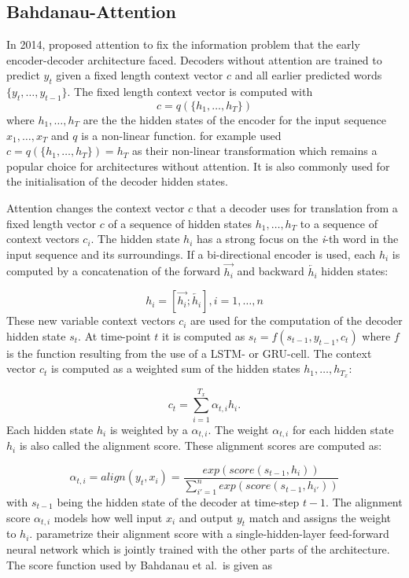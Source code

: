\documentclass[]{krantz}
\begin{document}
\hypertarget{bahdanau-attention}{%
\subsection{Bahdanau-Attention}\label{bahdanau-attention}}

In 2014, \citet{bahdanau2014neural} proposed attention to fix the information problem that
the early encoder-decoder architecture faced. Decoders without attention are trained to predict \(y_{t}\)
given a fixed length context vector \(c\) and all earlier predicted words \(\{y_t, \dots, y_{t-1}\}\).
The fixed length context vector is computed with
\[c=q(\{h_1,\dots,h_T\})\] where \(h_1,\dots,h_T\) are the the hidden states of the encoder for the input sequence
\(x_1,\dots, x_T\) and \(q\) is a non-linear function. \citet{sutskever2014sequence} for example used
\(c = q(\{h_1,\dots,h_T\}) = h_T\) as their non-linear transformation which remains a popular
choice for architectures without attention. It is also commonly used for the initialisation of the decoder hidden states.

Attention changes the context vector \(c\) that a decoder uses for translation from a fixed
length vector \(c\) of a sequence of hidden states \(h_1, \dots, h_T\) to a sequence
of context vectors \(c_i\). The hidden state \(h_i\) has a strong focus on the \emph{i}-th
word in the input sequence and its surroundings.
If a bi-directional encoder is used, each \(h_i\) is computed by a concatenation of the forward
\(\overrightarrow{h_i}\) and backward \(\overleftarrow{h_i}\) hidden states:

\[
h_i = [\overrightarrow{h_i}; \overleftarrow{h_i}], i = 1,\dots,n
\]
These new variable context vectors \(c_i\) are used for the computation of the decoder hidden state \(s_t\).
At time-point \(t\) it is computed as \(s_t = f(s_{t-1},y_{t-1},c_t)\) where \(f\) is the function resulting from
the use of a LSTM- or GRU-cell.
The context vector \(c_t\) is computed as a weighted sum of the hidden
states \(h_1,\dots, h_{T_x}\):

\[
c_t = \sum^{T_x}_{i=1}\alpha_{t,i}h_i.
\]
Each hidden state \(h_i\) is weighted by a \(\alpha_{t,i}\).
The weight \(\alpha_{t,i}\) for each hidden state \(h_i\) is also called the alignment score.
These alignment scores are computed as:

\[
\alpha_{t,i} = align(y_t, x_i) =\frac{exp(score(s_{t-1},h_i))}{\sum^{n}_{i'=1}exp(score(s_{t-1},h_{i'}))}
\]
with \(s_{t-1}\) being the hidden state of the decoder at time-step \(t-1\).
The alignment score \(\alpha_{t,i}\) models how well input \(x_i\) and output \(y_t\) match
and assigns the weight to \(h_i\). \citet{bahdanau2014neural} parametrize their alignment
score with a single-hidden-layer feed-forward neural network which is jointly
trained with the other parts of the architecture. The score function used by Bahdanau et
al.~is given as
\end{document}
